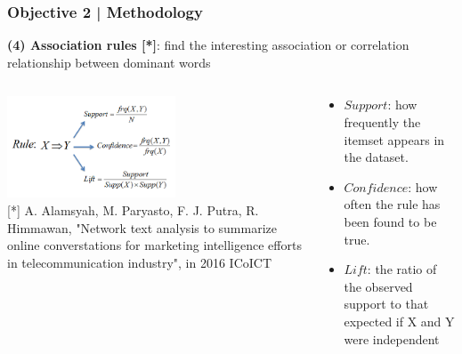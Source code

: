\documentclass{beamer}
\begin{document}
\begin{frame}
\frametitle{Objective 2 | Methodology}
\textbf{(4) Association rules [*]}: find the interesting association or correlation relationship between dominant words \\


\begin{columns}
	\begin{column}{.55\textwidth}
		\includegraphics[width=50mm]{AR_1.png}\\
{\tiny 	[*] A. Alamsyah, M. Paryasto, F. J. Putra, R. Himmawan, "Network text analysis to summarize online converstations for marketing intelligence efforts in telecommunication industry", in 2016 ICoICT}
	\end{column}
	\begin{column}{.55\textwidth}
	\begin{itemize}
		\item $Support$: how frequently the itemset appears in the dataset.
		
		
		\item $Confidence$: how often the rule has been found to be true.
		
		
		\item $Lift$: the ratio of the observed support to that expected if X and Y were independent
		
	\end{itemize}
	\end{column}
\end{columns}


\end{frame}
\end{document}
